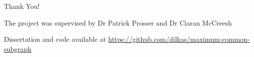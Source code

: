 \documentclass{beamer}
\begin{document}
\section{}

{
  \begin{frame}{Thank You!}
    \begin{block}{The project was supervised by}
      Dr Patrick Prosser and Dr Ciaran McCreesh
    \end{block}
    \bigskip
    \begin{block}{Dissertation and code available at}
    \url{https://github.com/dilkas/maximum-common-subgraph}
    \end{block}
  \end{frame}
}
\end{document}
